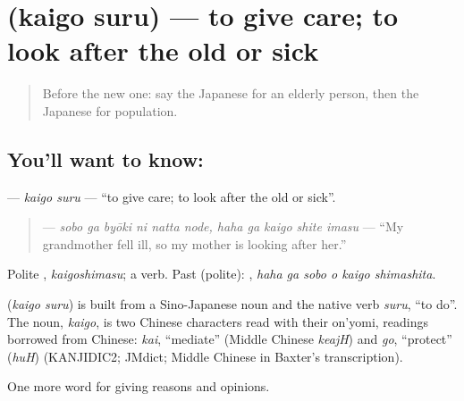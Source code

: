 \section[\texorpdfstring{\ja{かいごする} (kaigo suru)}{かいごする (kaigo suru)}]{ (kaigo suru) — to give care; to look after the old or sick}

\label{lesson:JA-C333-kaigo-suru}



\begin{quote}
Before the new one: say the Japanese for an elderly person, then the Japanese for population.
\end{quote}

\subsection*{You'll want to know: }
\textbf{} — \emph{kaigo suru} — \textquotedblleft{}to give care; to look after the old or sick\textquotedblright{}.

\begin{quote}
\textbf{   } — \emph{sobo ga byōki ni natta node, haha ga kaigo shite imasu} — \textquotedblleft{}My grandmother fell ill, so my mother is looking after her.\textquotedblright{}
\end{quote}

Polite \textbf{}, \emph{kaigoshimasu}; a  verb. Past (polite): \textbf{  }, \emph{haha ga sobo o kaigo shimashita}.

\begin{cousinweb}
\textbf{} (\emph{kaigo suru}) is built from a Sino-Japanese noun and the native verb \emph{suru}, \textquotedblleft{}to do\textquotedblright{}. The noun, \emph{kaigo}, is two Chinese characters read with their on'yomi, readings borrowed from Chinese: \emph{kai}, \textquotedblleft{}mediate\textquotedblright{} (Middle Chinese \emph{keajH}) and \emph{go}, \textquotedblleft{}protect\textquotedblright{} (\emph{huH}) (KANJIDIC2; JMdict; Middle Chinese in Baxter's transcription).
\end{cousinweb}

\begin{grammarlens}[title={What you've built}]
One more word for giving reasons and opinions.
\end{grammarlens}

